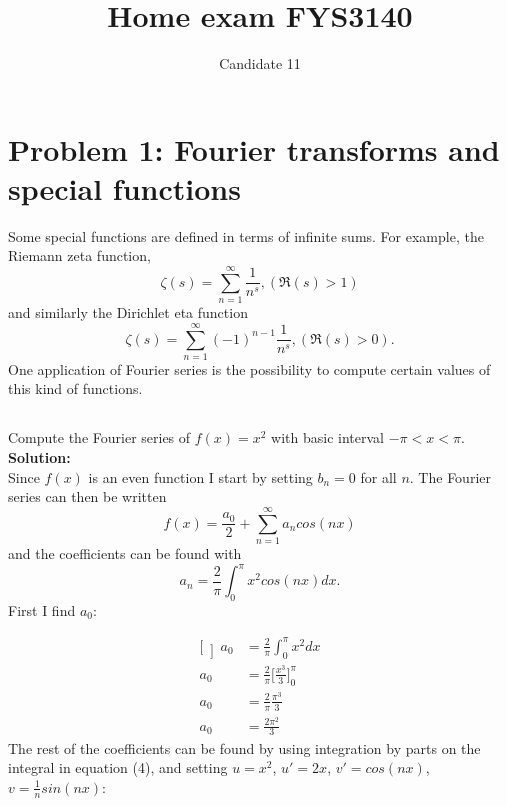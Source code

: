\documentclass[a4paper,12pt]{article}
\title{Home exam FYS3140}
\author{Candidate 11}
\begin{document}
\maketitle
\tableofcontents
\newpage

\section{Problem 1: Fourier transforms and special functions}
Some special functions are defined in terms of infinite sums. For example, the Riemann zeta function,
\begin{equation}
\zeta(s) = \sum_{n=1}^{\infty}\frac{1}{n^s}, (\Re(s) > 1)
\end{equation}
and similarly the Dirichlet eta function
\begin{equation}
\zeta(s) = \sum_{n=1}^{\infty}(-1)^{n-1}\frac{1}{n^s}, (\Re(s) > 0).
\end{equation}
One application of Fourier series is the possibility to compute certain values of this kind of functions.\\
\subsection{}
Compute the Fourier series of $f(x) = x^2$ with basic interval $ -\pi < x < \pi$.\\

\textbf{Solution:}\\
Since $f(x)$ is an even function I start by setting $b_n = 0$ for all $n$.
The Fourier series can then be written
\begin{equation}
f(x) = \frac{a_0}{2} + \sum_{n=1}^{\infty}a_n cos(nx)
\end{equation}
and the coefficients can be found with 
\begin{equation}
a_n = \frac{2}{\pi}\int_{0}^{\pi}x^2cos(nx)dx.
\end{equation}
First I find $a_0$:

\begin{equation*}
\begin{aligned}[\left]
a_0 &= \frac{2}{\pi}\int_{0}^{\pi}x^2dx\\
a_0 &= \frac{2}{\pi}\bigg[\frac{x^3}{3}\bigg]_{0}^{\pi}\\
a_0 &= \frac{2}{\pi}\frac{\pi^3}{3}\\
a_0 &= \frac{2\pi^2}{3}
\end{aligned}
\end{equation*}
The rest of the coefficients can be found by using integration by parts on the integral in equation (4), and setting $u=x^2$, $u' = 2x$, $v' = cos(nx)$, $v = \frac{1}{n}sin(nx)$:
\end{document}
